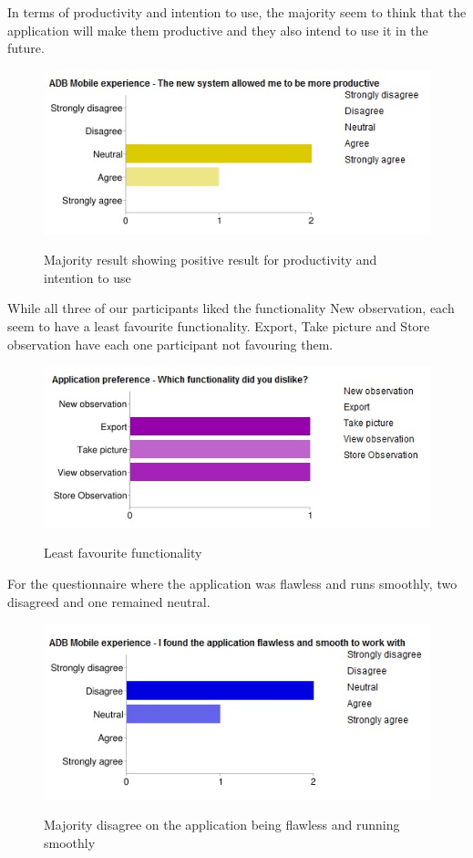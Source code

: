  In terms of productivity and intention to use, the majority seem to think that the application will make them productive and they also intend to use it in the future.

\begin{figure}[htb]
    \centering
    \includegraphics[scale=0.7]{ut_pic/productivityandintensiontouse1.jpg}
    \label{fig:Productivity and intention to use}
    \caption{Majority result showing positive result for productivity and intention to use}
\end{figure}

While all three of our participants liked the functionality New observation, each seem to have a least favourite functionality. Export, Take picture and Store observation have each one participant not favouring them.

\begin{figure}[htb]
    \centering
    \includegraphics[scale=0.7]{ut_pic/Functionalitydislike1.jpg}
    \label{fig:Functionality favourability}
    \caption{Least favourite functionality}
\end{figure}

For the questionnaire where the application was flawless and runs smoothly, two disagreed and one remained neutral.

\begin{figure}[htb]
    \centering
    \includegraphics[scale=0.6]{ut_pic/flawless1.jpg}
    \label{fig:App was flawless}
    \caption{Majority disagree on the application being flawless and running smoothly}
\end{figure}

